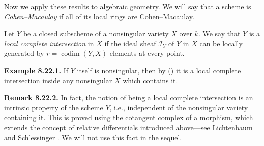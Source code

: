 {\smallskip
Now we apply these results to algebraic geometry. We will say that a scheme is \emph{Cohen--Macaulay} if all of its local rings are Cohen--Macaulay.

\Dfn Let $Y$ be a closed subscheme of a nonsingular variety $X$ over $k$. We say that $Y$ is a \emph{local complete intersection} in $X$ if the ideal sheaf $\mathcal I_Y$ of $Y$ in $X$ can be locally generated by $r=\operatorname{codim}(Y,X)$ elements at every point.

\medskip
\noindent\hypertarget{result-II-8.22.1}{}\textbf{Example 8.22.1.} If $Y$ itself is nonsingular, then by () it is a local complete intersection inside any nonsingular $X$ which contains it.

\medskip
\noindent\hypertarget{result-II-8.22.2}{}\textbf{Remark 8.22.2.} In fact, the notion of being a local complete intersection is an intrinsic property of the scheme $Y$, i.e., independent of the nonsingular variety containing it. This is proved using the cotangent complex of a morphism, which extends the concept of relative differentials introduced above---see Lichtenbaum and Schlessinger . We will not use this fact in the sequel.
}
